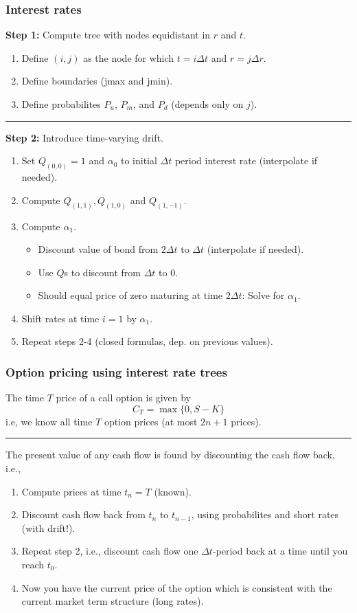 \begin{frame}
  \frametitle{Interest rates}
\textbf{Step 1:} Compute tree with nodes equidistant in $r$ and $t$.
%
\begin{enumerate}
\item Define $(i, j)$ as the node for which $t = i \Delta t$
  and $r = j \Delta r$.
\item Define boundaries (jmax and jmin).
\item Define probabilites $P_u$, $P_m$, and $P_d$ (depends
  only on $j$).
\end{enumerate}
%
\vspace{0.25cm}
\hrule
\vspace{0.25cm}
%
\textbf{Step 2:} Introduce time-varying drift.
\begin{enumerate}
\item Set $Q_{(0,0)} = 1$ and $\alpha_{0}$ to initial
  $\Delta t$ period interest rate (interpolate if needed).
\item Compute $Q_{(1,1)}, Q_{(1,0)}$ and $Q_{(1,-1)}$.
\item Compute $\alpha_{1}$.
  \begin{itemize}
  \item Discount value of bond from $2\Delta t$ to $\Delta
    t$ (interpolate if needed).
  \item Use $Q$s to discount from $\Delta t$ to 0.
  \item Should equal price of zero maturing at time $2\Delta
    t$: Solve for $\alpha_{1}$.
  \end{itemize}
\item Shift rates at time $i = 1$ by $\alpha_{1}$.
\item Repeat steps 2-4 (closed formulas, dep. on previous values).
\end{enumerate}
%
\end{frame}


\begin{frame}[fragile]
  \frametitle{Option pricing using interest rate trees}
  The time $T$ price of a call option is given by
  \begin{equation}
    C_T = \operatorname{max} \{ 0, S - K \}
  \end{equation}
  i.e, we know all time $T$ option prices (at most $2n+1$
  prices).
\vspace{0.25cm}
\hrule
\vspace{0.25cm}
  The present value of any cash flow is found by discounting
  the cash flow back, i.e.,
  \begin{enumerate}
  \item Compute prices at time $t_n = T$ (known).
  \item Discount cash flow back from $t_n$ to $t_{n-1}$,
    using probabilites and short rates (with drift!).
  \item Repeat step 2, i.e., discount cash flow one $\Delta
    t$-period back at a time until you reach $t_0$.
  \item Now you have the current price of the option which
    is consistent with the current market term structure
    (long rates).
  \end{enumerate}
\end{frame}
